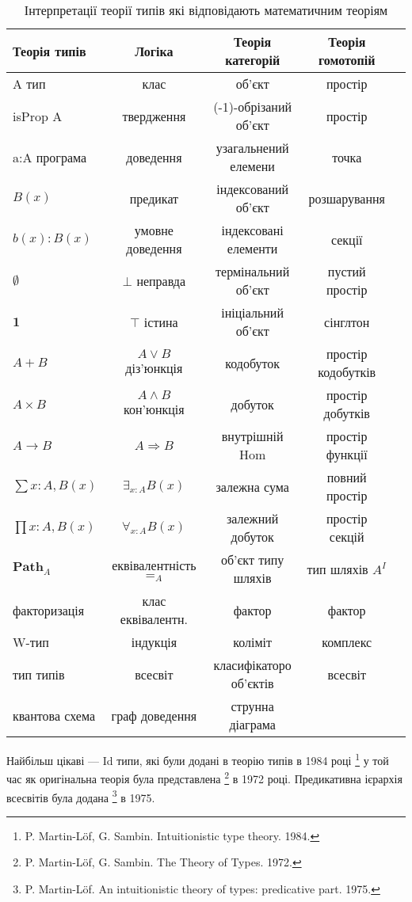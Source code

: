 \begin{table}[h]
\begin{adjustwidth}{-3cm}{}
  \caption{Інтерпретації теорії типів які відповідають математичним теоріям}
 \begin{tabular}{lcccc}
    \hline
       \textbf{Теорія типів} & \textbf{Логіка} & \textbf{Теорія категорій} & \textbf{Теорія гомотопій} \\
    \hline
       A тип & клас & об'єкт & простір \\
       isProp A & твердження & (-1)-обрізаний об'єкт & простір \\
       a:A програма & доведення & узагальнений елемени & точка \\
       $B(x)$ & предикат & індексований об'єкт & розшарування \\
       $b(x) : B(x)$ & умовне доведення & індексовані елементи & секції\\
       $\emptyset$ & $\bot$ неправда & термінальний об'єкт & пустий простір \\
       $\mathbf{1}$ & $\top$ істина & ініціальний об'єкт & сінглтон \\
       $A + B$ & $A\vee B$ діз'юнкція & кодобуток & простір кодобутків \\
       $A\times B$ & $A\wedge B$ кон'юнкція & добуток & простір добутків \\
       $A\to B$ & $A\Rightarrow B$ & внутрішній Hom & простір функції \\
       $\sum{x:A},B(x)$ & $\exists_{x:A}B(x)$ & залежна сума & повний простір \\
       $\prod{x:A},B(x)$ & $\forall_{x:A}B(x)$ & залежний добуток & простір секцій\\
       $\mathbf{Path}_{A}$ & еквівалентність $=_A$ & об'єкт типу шляхів & тип шляхів $A^I$ \\
       факторизація & клас еквівалентн. & фактор & фактор \\
       W-тип & індукція & коліміт & комплекс\\
       тип типів & всесвіт & класифікаторо об'єктів & всесвіт \\
       квантова схема & граф доведення & струнна діаграма & \\
      \hline
  \end{tabular}
  \end{adjustwidth}
\end{table}

Найбільш цікаві --- Id типи, які були додані в теорію типів в 1984 році
\footnote{P. Martin-Löf, G. Sambin. Intuitionistic type theory. 1984.}
у той час як оригінальна теорія була представлена
\footnote{P. Martin-Löf, G. Sambin. The Theory of Types. 1972.} в 1972 році.
Предикативна ієрархія всесвітів була додана \footnote{P. Martin-Löf. An
intuitionistic theory of types: predicative part. 1975.} в 1975.

